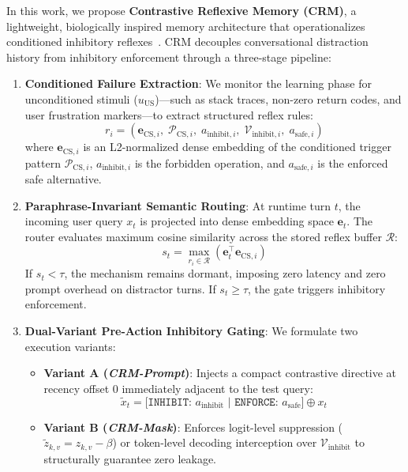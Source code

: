 \documentclass[11pt,journal,onecolumn]{IEEEtran}
\begin{document}
In this work, we propose \textbf{Contrastive Reflexive Memory (CRM)}, a lightweight, biologically inspired memory architecture that operationalizes conditioned inhibitory reflexes~\cite{pavlov1927conditioned,rescorla1972theory}. CRM decouples conversational distraction history from inhibitory enforcement through a three-stage pipeline:
\begin{enumerate}
    \item \textbf{Conditioned Failure Extraction}: We monitor the learning phase for unconditioned stimuli ($u_{\text{US}}$)---such as stack traces, non-zero return codes, and user frustration markers---to extract structured reflex rules:
    \begin{equation}
        r_i = \left(\mathbf{e}_{\text{CS}, i},\; \mathcal{P}_{\text{CS}, i},\; a_{\text{inhibit}, i},\; \mathcal{V}_{\text{inhibit}, i},\; a_{\text{safe}, i}\right)
    \end{equation}
    where $\mathbf{e}_{\text{CS}, i}$ is an L2-normalized dense embedding of the conditioned trigger pattern $\mathcal{P}_{\text{CS}, i}$, $a_{\text{inhibit}, i}$ is the forbidden operation, and $a_{\text{safe}, i}$ is the enforced safe alternative.
    
    \item \textbf{Paraphrase-Invariant Semantic Routing}: At runtime turn $t$, the incoming user query $x_t$ is projected into dense embedding space $\mathbf{e}_t$. The router evaluates maximum cosine similarity across the stored reflex buffer $\mathcal{R}$:
    \begin{equation}
        s_t = \max_{r_i \in \mathcal{R}} \left(\mathbf{e}_t^\top \mathbf{e}_{\text{CS}, i}\right)
    \end{equation}
    If $s_t < \tau$, the mechanism remains dormant, imposing zero latency and zero prompt overhead on distractor turns. If $s_t \ge \tau$, the gate triggers inhibitory enforcement.
    
    \item \textbf{Dual-Variant Pre-Action Inhibitory Gating}: We formulate two execution variants:
    \begin{itemize}
        \item \textbf{Variant A (\textit{CRM-Prompt})}: Injects a compact contrastive directive at recency offset 0 immediately adjacent to the test query:
        \begin{equation}
            \tilde{x}_t = \texttt{[INHIBIT: } a_{\text{inhibit}} \texttt{ | ENFORCE: } a_{\text{safe}} \texttt{]} \oplus x_t
        \end{equation}
        \item \textbf{Variant B (\textit{CRM-Mask})}: Enforces logit-level suppression ($\tilde{z}_{k,v} = z_{k,v} - \beta$) or token-level decoding interception over $\mathcal{V}_{\text{inhibit}}$ to structurally guarantee zero leakage.
    \end{itemize}
\end{enumerate}
\end{document}
